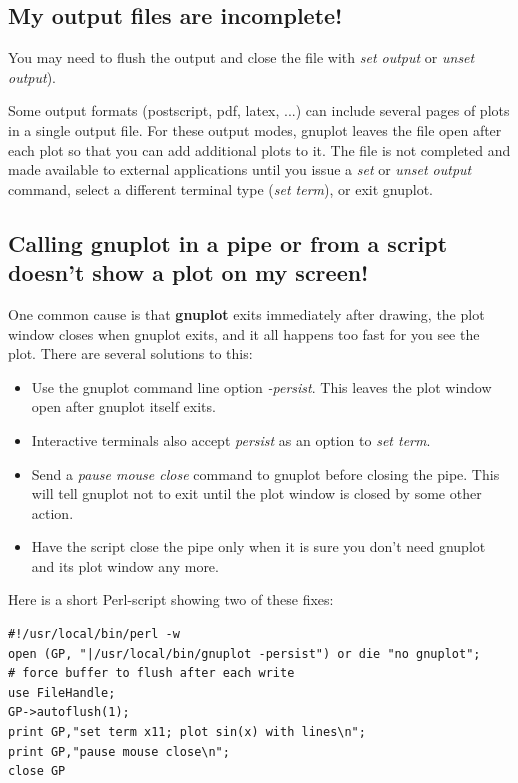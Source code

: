 \documentclass[letter,11pt]{article}
\newcommand{\gnuplot}{\textbf{gnuplot }}
\begin{document}
{\subsection{My output files are incomplete!}

You may need to flush the output and close the file with
{\em set output} or {\em unset output}).

Some output formats (postscript, pdf, latex, ...) can include several
pages of plots in a single output file.  For these output modes, gnuplot
leaves the file open after each plot so that you can add additional plots
to it.  The file is not completed and made available to external applications
until you issue a {\em set} or {\em unset output} command,
select a different terminal type ({\em set term}), or exit gnuplot.


\subsection{Calling gnuplot in a pipe or from a script doesn't show a plot on my screen!}

One common cause is that \gnuplot exits immediately after drawing,
the plot window closes when gnuplot exits, and it all happens too fast
for you see the plot.
There are several solutions to this:
\begin{itemize}
\item  Use the gnuplot command line option {\em -persist}.
       This leaves the plot window open after gnuplot itself exits.
\item  Interactive terminals also accept {\em persist} as an option to {\em set term}.
\item  Send a {\em pause mouse close} command to gnuplot before closing the pipe.
       This will tell gnuplot not to exit until the plot window is closed by
       some other action.
\item  Have the script close the pipe only when it is sure you don't need
       gnuplot and its plot window any more.
\end{itemize}

Here is a short Perl-script showing two of these fixes:
\small
\begin{verbatim}
#!/usr/local/bin/perl -w
open (GP, "|/usr/local/bin/gnuplot -persist") or die "no gnuplot";
# force buffer to flush after each write
use FileHandle;
GP->autoflush(1);
print GP,"set term x11; plot sin(x) with lines\n";
print GP,"pause mouse close\n";
close GP
\end{verbatim}
\normalsize


}
\end{document}
